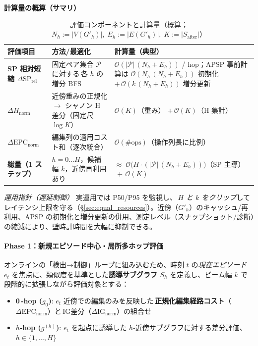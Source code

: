 \documentclass[ja=standard,xelatex]{bxjsarticle}
\newcommand{\gednorm}{\Delta\mathrm{EPC}_{\mathrm{norm}}}
\newcommand{\ignorm}{\Delta\mathrm{IG}_{\mathrm{norm}}}
\begin{document}
\medskip
\noindent\textbf{計算量の概算（サマリ）}
\begin{table}[H]
\centering
\small
\caption{評価コンポーネントと計算量（概算；$N_h{:=}|V(G'_h)|,\;E_h{:=}|E(G'_h)|,\;K{:=}|S_{\mathrm{after}}|$）}
\label{tab:complexity_summary}
\begin{tabular}{@{}p{4.2cm}p{5.8cm}p{5.6cm}@{}}
\toprule
評価項目 & 方法/最適化 & 計算量（典型） \\
\midrule
\textbf{SP 相対短縮 $\Delta\mathrm{SP}_{\mathrm{rel}}$} & 固定ペア集合 $\mathcal{P}$ に対する\,各 $h$ の増分 BFS & $\mathcal{O}(|\mathcal{P}|\,(N_h{+}E_h))$ / hop；APSP 事前計算は $\mathcal{O}(N_h\,(N_h{+}E_h))$ 初期化 $+\,\mathcal{O}(k\,(N_h{+}E_h))$ 増分更新 \\
\textbf{$\Delta H_{\mathrm{norm}}$} & 近傍重みの正規化 $\to$ シャノン H 差分（固定尺 $\log K$） & $\mathcal{O}(K)$（重み） $+\,\mathcal{O}(K)$（H 集計） \\
\textbf{$\Delta\mathrm{EPC}_{\mathrm{norm}}$} & 編集列の適用コスト和（逐次統合） & $\mathcal{O}(\#\text{ops})$（操作列長に比例） \\
\textbf{総量（1 ステップ）} & $h{=}0\ldots H$，候補幅 $k$，近傍再利用あり & $\approx\;\mathcal{O}\!\big(H\cdot(|\mathcal{P}|\,(N_h{+}E_h))\big)$（SP 主導）$\,+\,\mathcal{O}(K)$ \\
\bottomrule
\end{tabular}
\end{table}

\noindent\textit{運用指針（遅延制御）}\; 実運用では P50/P95 を監視し、\,\emph{$H$ と $k$ をクリップ}してレイテンシ上限を守る（\S\ref{sec:equal_resources}）。近傍（$G'_h$）のキャッシュ/再利用、APSP の初期化と増分更新の併用、測定レベル（スナップショット/診断）の縮減により、壁時計時間を大幅に抑制できる。

\paragraph{Phase 1：新規エピソード中心・局所多ホップ評価}
オンラインの「検出→制御」ループに組み込むため、時刻 $t$ の\emph{現在エピソード} $e_t$ を焦点に、類似度を基準とした\textbf{誘導サブグラフ $S_h$} を定義し、ビーム幅 $k$ で段階的に拡張しながら評価対象とする：

\begin{itemize}[leftmargin=*]
  \item \textbf{0\,\mbox{-}hop ($g_0$)}: $e_t$ 近傍での編集のみを反映した\,\textbf{正規化編集経路コスト}（$\gednorm$）と\,IG差分（$\ignorm$）の組合せ
  \item \textbf{$h$-hop ($g^{(h)}$)}: $e_t$ を起点に誘導した $h$-近傍サブグラフに対する差分評価、$h\in\{1,\dots,H\}$
\end{itemize}
\end{document}
